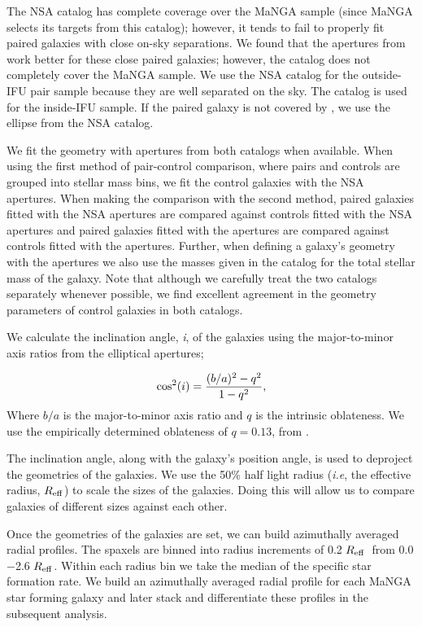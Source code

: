 \documentclass[apj,twocolumn]{emulateapj}
\newcommand{\reff}{$R_{\rm eff}$}
\begin{document}
\begin{CJK*}{UTF8}{gbsn}
The NSA catalog has complete coverage over the MaNGA sample (since MaNGA selects its targets from this catalog); however, it tends to fail to properly fit paired galaxies with close on-sky separations. We found that the apertures from \citet{Simard:2011} work better for these close paired galaxies; however, the catalog does not completely cover the MaNGA sample. We use the NSA catalog for the outside-IFU pair sample because they are well separated on the sky. The \citet{Simard:2011} catalog is used for the inside-IFU sample. If the paired galaxy is not covered by \citet{Simard:2011}, we use the ellipse from the NSA catalog. 

We fit the geometry with apertures from both catalogs when available. When using the first method of pair-control comparison, where pairs and controls are grouped into stellar mass bins, we fit the control galaxies with the NSA apertures. When making the comparison with the second method, paired galaxies fitted with the NSA apertures are compared against controls fitted with the NSA apertures and paired galaxies fitted with the \citet{Simard:2011} apertures are compared against controls fitted with the \citet{Simard:2011} apertures. Further, when defining a galaxy's geometry with the \citet{Simard:2011} apertures we also use the masses given in the catalog for the total stellar mass of the galaxy. Note that although we carefully treat the two catalogs separately whenever possible, we find excellent agreement in the geometry parameters of control galaxies in both catalogs.

We calculate the inclination angle, {\it i}, of the galaxies using the major-to-minor axis ratios from the elliptical apertures;

\begin{equation}
{\rm cos^2}(i) = \frac{(b/a)^2 - q^2}{1 - q^2},
\end{equation}
Where $b/a$ is the major-to-minor axis ratio and $q$ is the intrinsic oblateness. We use the empirically determined oblateness of $q = 0.13$, from \citet{Giovanelli:1994}.

The inclination angle, along with the galaxy's position angle, is used to deproject the geometries of the galaxies. We use the 50\% half light radius ({\it i.e}, the effective radius, \reff) to scale the sizes of the galaxies. Doing this will allow us to compare galaxies of different sizes against each other.

Once the geometries of the galaxies are set, we can build azimuthally averaged radial profiles. The spaxels are binned into radius increments of 0.2 \reff\ from 0.0$-$2.6 \reff. Within each radius bin we take the median of the specific star formation rate. We build an azimuthally averaged radial profile for each MaNGA star forming galaxy and later stack and differentiate these profiles in the subsequent analysis. 


\end{CJK*}
\end{document}
